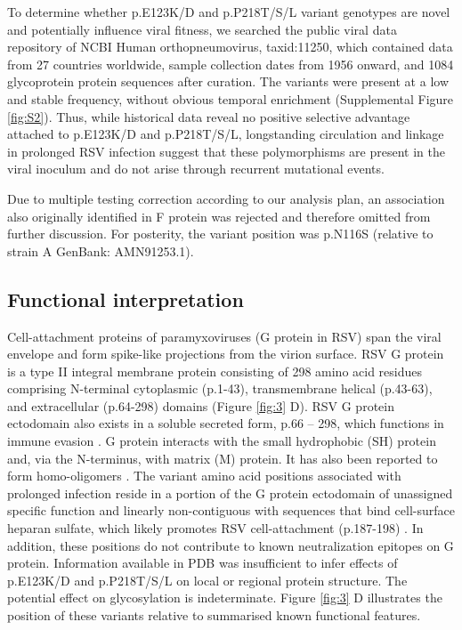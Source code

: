 \documentclass{article} %
\begin{document}
To determine whether p.E123K/D and p.P218T/S/L variant genotypes are novel and potentially influence viral fitness, we searched the public viral data repository of NCBI Human orthopneumovirus, taxid:11250, which contained data from 27 countries worldwide, sample collection dates from 1956 onward, and 1084 glycoprotein protein sequences after curation. 
The variants were present at a low and stable frequency, without obvious temporal enrichment (Supplemental Figure \ref{fig:S2}). 
Thus, while historical data reveal no positive selective advantage attached to p.E123K/D and p.P218T/S/L, longstanding circulation and linkage in prolonged RSV infection suggest that these polymorphisms are present in the viral inoculum and do not arise through recurrent mutational events. 

Due to multiple testing correction according to our analysis plan, an association also originally identified in F protein was rejected and therefore omitted from further discussion. 
For posterity, the variant position was p.N116S (relative to strain A GenBank: AMN91253.1). 

\subsection{Functional interpretation}
Cell-attachment proteins of paramyxoviruses (G protein in RSV) span the viral envelope and form spike-like projections from the virion surface. 
RSV G protein is a type II integral membrane protein consisting of 298 amino acid residues comprising N-terminal cytoplasmic (p.1-43), transmembrane helical (p.43-63), and extracellular (p.64-298) domains (Figure  \ref{fig:3} D). 
RSV G protein ectodomain also exists in a soluble secreted form, p.66 – 298, which functions in immune evasion
\citep{levine1987demonstration, feldman1999identification, feldman2000fusion}.
G protein interacts with the small hydrophobic (SH) protein 
\citep{rixon2005respiratory}
and, via the N-terminus, with matrix (M) 
\citep{ghildyal2005interaction} 
protein.
It has also been reported to form homo-oligomers 
\citep{collins1992oligomerization}.
The variant amino acid positions associated with prolonged infection reside in a portion of the G protein ectodomain of unassigned specific function and linearly non-contiguous with sequences that bind cell-surface heparan sulfate, which likely promotes RSV cell-attachment (p.187-198)
\citep{levine1987demonstration, feldman1999identification, feldman2000fusion}.
In addition, these positions do not contribute to known neutralization epitopes on G protein. 
Information available in PDB was insufficient to infer effects of p.E123K/D and p.P218T/S/L on local or regional protein structure. The potential effect on glycosylation is indeterminate. 
Figure \ref{fig:3} D  illustrates the position of these variants relative to summarised known functional features. 
\end{document}

